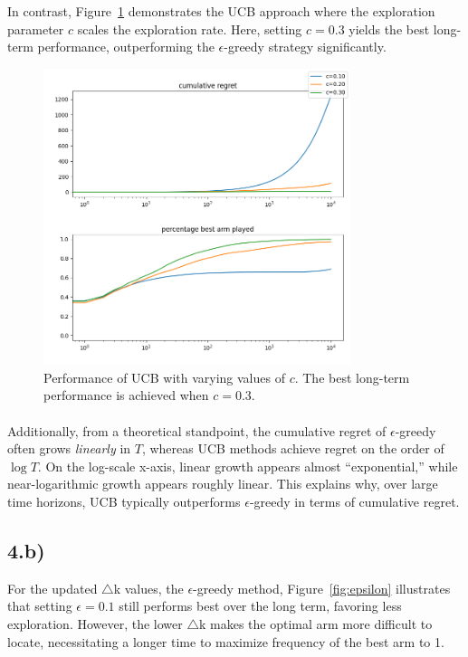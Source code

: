 \documentclass[11pt]{article}
\begin{document}
\newpage

In contrast, Figure~\ref{fig:ucb} demonstrates the UCB approach where the exploration parameter $c$ scales the exploration rate.
Here, setting $c = 0.3$ yields the best long-term performance, outperforming the $\epsilon$-greedy strategy significantly.

\begin{figure}[htbp]
\centering
\includegraphics[width=0.8\textwidth]{images/Figure_3.png}
\caption{Performance of UCB with varying values of $c$. The best long-term performance is achieved when $c = 0.3$.}
\label{fig:ucb}
\end{figure}

\paragraph{}
Additionally, from a theoretical standpoint, the cumulative regret of $\epsilon$-greedy often grows \emph{linearly} in $T$,
whereas UCB methods achieve regret on the order of $\log T$. On the log-scale x-axis, linear growth appears almost
``exponential,'' while near-logarithmic growth appears roughly linear. This explains why, over large time horizons,
UCB typically outperforms $\epsilon$-greedy in terms of cumulative regret.

\newpage
\subsection*{4.b)}
For the updated $\bigtriangleup$k values, the $\epsilon$-greedy method, Figure~\ref{fig:epsilon} illustrates that setting $\epsilon = 0.1$ still performs best over the long term,
favoring less exploration. However, the lower $\bigtriangleup$k makes the optimal arm more difficult to locate, necessitating a longer time to maximize frequency of
the best arm to 1.
\end{document}
